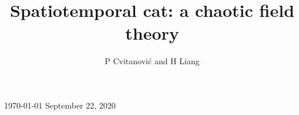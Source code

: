 \documentclass[12pt]{iopart}
\begin{document}
\title[Spatiotemporal cat]
{Spatiotemporal cat: a chaotic field theory} %

    \author{
P Cvitanovi{\'c}
         and
H Liang
    }\address{
Center for Nonlinear Science, School of Physics,
            Georgia Institute of Technology,
            Atlanta, GA 30332-0430, USA
    } 
    \vspace{10pt}
    \begin{indented}
    \item[]
    \ifboyscout\today\else
September 22, 2020
    \fi
    \end{indented}

    \begin{abstract}

    \end{abstract}



\submitto{\NL}
    \ifsubmission
\maketitle %
    \fi

\renewcommand{\statesp}{phase space}
\renewcommand{\Statesp}{Phase space}
\renewcommand{\stateDsp}{phase-space}
\renewcommand{\StateDsp}{Phase-space}


    \ifboyscout\clearpage\fi

    \ifboyscout\clearpage\fi


\renewcommand{\statesp}{state space}
\renewcommand{\Statesp}{State space}
\renewcommand{\stateDsp}{state-space}
\renewcommand{\StateDsp}{State-space}

    \ifboyscout\clearpage\fi

    \ifboyscout\clearpage\fi

    \ifboyscout\clearpage\fi

    \ifboyscout\clearpage\fi

\end{document}
